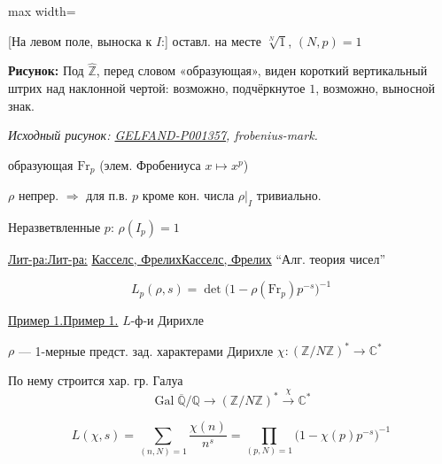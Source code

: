 \documentclass[11pt]{article}
\theoremstyle{definition}
\theoremstyle{remark}
\newcommand{\SourceFigure}[3]{%
  \par\begingroup\color{blue!60!black}\textbf{\hyperref[#1:source-page]{Source figure #1/#2}:} #3%
  \par\textit{Consult the authoritative scan at this locator.}\endgroup\par%
}
\renewcommand{\SourceFigure}[3]{%
  \par\begingroup\color{blue!55!black}\textbf{Рисунок:} #3%
  \par{\small\textit{Исходный рисунок: \hyperref[#1:source-page]{#1}, #2.}}%
  \endgroup\par%
}
\let\DiplomaticMathUnderline\underline
\renewcommand{\underline}[1]{\ifmmode\DiplomaticMathUnderline{#1}\else\uline{#1}\fi}
\begin{document}
\begin{center}
\begin{adjustbox}{max width=\linewidth}
\end{adjustbox}
\end{center}

[На левом поле, выноска к $I$:] оставл. на месте $\sqrt[N]{1}$,
$(N,p)=1$

\SourceFigure{GELFAND-P001357}{frobenius-mark}{Под $\widehat{\mathbb{Z}}$, перед словом «образующая», виден короткий вертикальный штрих над наклонной чертой: возможно, подчёркнутое $1$, возможно, выносной знак.}

образующая $\mathrm{Fr}_p$ (элем. Фробениуса $x\mapsto x^p$)

$\rho$ непрер. $\Rightarrow$ для п.в. $p$ кроме кон. числа
$\rho|_I$ тривиально.

Неразветвленные $p$: $\rho(I_p)=1$

\underline{Лит-ра:} \underline{Касселс, Фрелих} “Алг. теория чисел”

\begin{equation*}
L_p(\rho,s)=\det\bigl(1-\rho(\mathrm{Fr}_p)p^{-s}\bigr)^{-1}
\end{equation*}

\underline{Пример 1.} $L$-ф-и Дирихле

$\rho$ — 1-мерные предст. зад. характерами Дирихле
$\chi:(\mathbb{Z}/N\mathbb{Z})^*\longrightarrow\mathbb{C}^*$

По нему строится хар. гр. Галуа
\begin{equation*}
\operatorname{Gal}\overline{\mathbb{Q}}/\mathbb{Q}
\longrightarrow (\mathbb{Z}/N\mathbb{Z})^*
\overset{\chi}{\longrightarrow}\mathbb{C}^*
\end{equation*}

\begin{equation*}
L(\chi,s)=\sum_{(n,N)=1}\frac{\chi(n)}{n^s}
=\prod_{(p,N)=1}\bigl(1-\chi(p)p^{-s}\bigr)^{-1}
\end{equation*}
\end{document}
